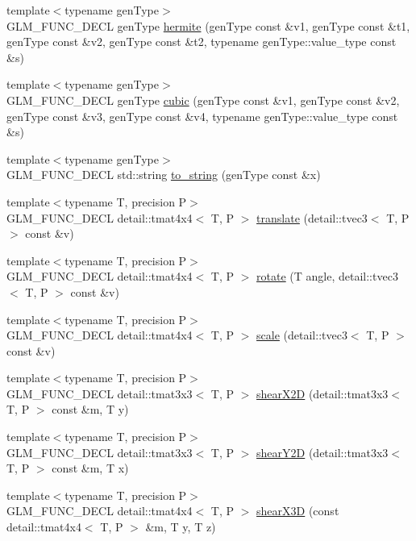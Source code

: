 \begin{CompactItemize}
\item 
{\footnotesize template$<$typename genType$>$ }\\GLM\_\-FUNC\_\-DECL genType \hyperlink{group__gtx__spline_ge95792c83c014a3c61b35312fb02679f}{hermite} (genType const \&v1, genType const \&t1, genType const \&v2, genType const \&t2, typename genType::value\_\-type const \&s)
\item 
{\footnotesize template$<$typename genType$>$ }\\GLM\_\-FUNC\_\-DECL genType \hyperlink{group__gtx__spline_g46e54d27ad211a24813f19b80aba0329}{cubic} (genType const \&v1, genType const \&v2, genType const \&v3, genType const \&v4, typename genType::value\_\-type const \&s)
\item 
{\footnotesize template$<$typename genType$>$ }\\GLM\_\-FUNC\_\-DECL std::string \hyperlink{group__gtx__string__cast_ga805c20a3b3ed546b5fccf481697565d}{to\_\-string} (genType const \&x)
\item 
{\footnotesize template$<$typename T, precision P$>$ }\\GLM\_\-FUNC\_\-DECL detail::tmat4x4$<$ T, P $>$ \hyperlink{group__gtx__transform_gc06efbcc43ab431cf6ae1ba0e6f03e86}{translate} (detail::tvec3$<$ T, P $>$ const \&v)
\item 
{\footnotesize template$<$typename T, precision P$>$ }\\GLM\_\-FUNC\_\-DECL detail::tmat4x4$<$ T, P $>$ \hyperlink{group__gtx__transform_g52e753e0ad1cb6ae700855cc9ca921ca}{rotate} (T angle, detail::tvec3$<$ T, P $>$ const \&v)
\item 
{\footnotesize template$<$typename T, precision P$>$ }\\GLM\_\-FUNC\_\-DECL detail::tmat4x4$<$ T, P $>$ \hyperlink{group__gtx__transform_g70f2d33f150672b9faca3b477fcca2c4}{scale} (detail::tvec3$<$ T, P $>$ const \&v)
\item 
{\footnotesize template$<$typename T, precision P$>$ }\\GLM\_\-FUNC\_\-DECL detail::tmat3x3$<$ T, P $>$ \hyperlink{group__gtx__transform2_gb571921ddab480d5cd402b5f3e325fb7}{shearX2D} (detail::tmat3x3$<$ T, P $>$ const \&m, T y)
\item 
{\footnotesize template$<$typename T, precision P$>$ }\\GLM\_\-FUNC\_\-DECL detail::tmat3x3$<$ T, P $>$ \hyperlink{group__gtx__transform2_g17fa300cd87fdaadb7b40970d1efc515}{shearY2D} (detail::tmat3x3$<$ T, P $>$ const \&m, T x)
\item 
{\footnotesize template$<$typename T, precision P$>$ }\\GLM\_\-FUNC\_\-DECL detail::tmat4x4$<$ T, P $>$ \hyperlink{group__gtx__transform2_ga091ba9f8bd59949adaf8ed5d4ec52ed}{shearX3D} (const detail::tmat4x4$<$ T, P $>$ \&m, T y, T z)

\end{CompactItemize}
